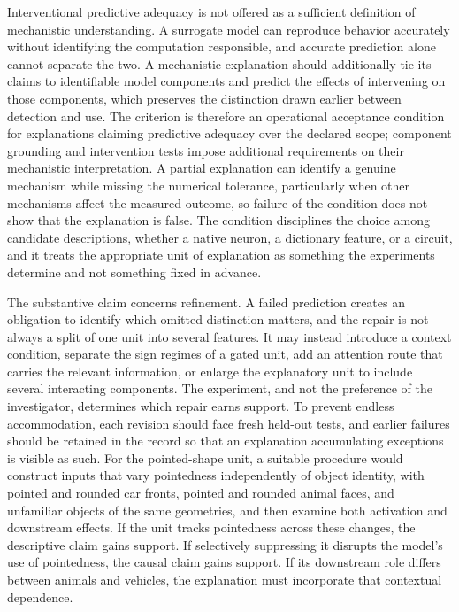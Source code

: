 \documentclass[11pt]{article}
\begin{document}
Interventional predictive adequacy is not offered as a sufficient definition of mechanistic understanding. A surrogate model can reproduce behavior accurately without identifying the computation responsible, and accurate prediction alone cannot separate the two. A mechanistic explanation should additionally tie its claims to identifiable model components and predict the effects of intervening on those components, which preserves the distinction drawn earlier between detection and use. The criterion is therefore an operational acceptance condition for explanations claiming predictive adequacy over the declared scope; component grounding and intervention tests impose additional requirements on their mechanistic interpretation. A partial explanation can identify a genuine mechanism while missing the numerical tolerance, particularly when other mechanisms affect the measured outcome, so failure of the condition does not show that the explanation is false. The condition disciplines the choice among candidate descriptions, whether a native neuron, a dictionary feature, or a circuit, and it treats the appropriate unit of explanation as something the experiments determine and not something fixed in advance.

The substantive claim concerns refinement. A failed prediction creates an obligation to identify which omitted distinction matters, and the repair is not always a split of one unit into several features. It may instead introduce a context condition, separate the sign regimes of a gated unit, add an attention route that carries the relevant information, or enlarge the explanatory unit to include several interacting components. The experiment, and not the preference of the investigator, determines which repair earns support. To prevent endless accommodation, each revision should face fresh held-out tests, and earlier failures should be retained in the record so that an explanation accumulating exceptions is visible as such. For the pointed-shape unit, a suitable procedure would construct inputs that vary pointedness independently of object identity, with pointed and rounded car fronts, pointed and rounded animal faces, and unfamiliar objects of the same geometries, and then examine both activation and downstream effects. If the unit tracks pointedness across these changes, the descriptive claim gains support. If selectively suppressing it disrupts the model's use of pointedness, the causal claim gains support. If its downstream role differs between animals and vehicles, the explanation must incorporate that contextual dependence.
\end{document}

